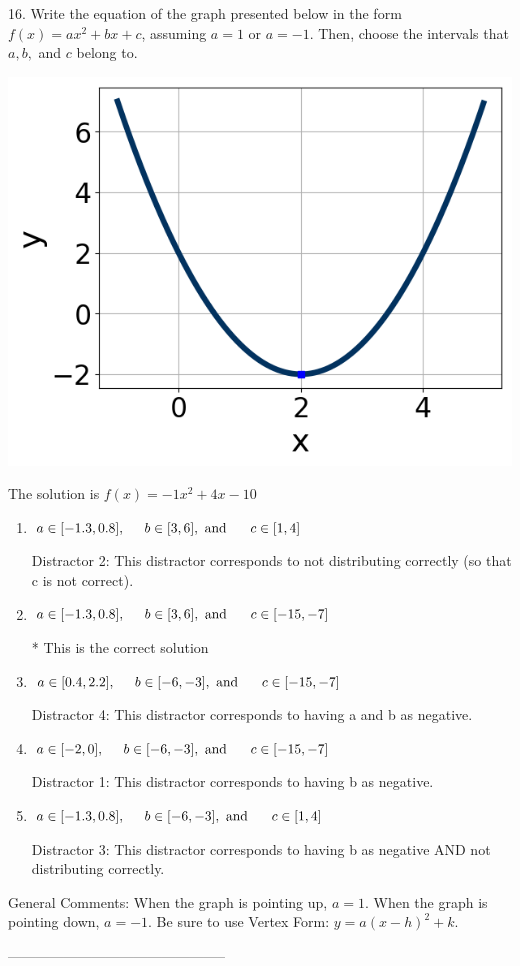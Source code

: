 16. Write the equation of the graph presented below in the form $f(x)=ax^2+bx+c$, assuming  $a=1$ or $a=-1$. Then, choose the intervals that $a, b,$ and $c$ belong to.
\begin{center} \includegraphics[scale=0.5]{../Figures/quadraticGraphToEquationA.png} \end{center}The solution is $ f(x) = -1x^{2} +4 x -10 $ 

\begin{enumerate}[label=\Alph*.] 
\item $ a \in [-1.3, 0.8], \hspace*{5mm} b \in [3, 6], \text{ and } \hspace*{5mm} c \in [1, 4] $ 

  Distractor 2: This distractor corresponds to not distributing correctly (so that c is not correct). 
\item $ a \in [-1.3, 0.8], \hspace*{5mm} b \in [3, 6], \text{ and } \hspace*{5mm} c \in [-15, -7] $ 

 * This is the correct solution 
\item $ a \in [0.4, 2.2], \hspace*{5mm} b \in [-6, -3], \text{ and } \hspace*{5mm} c \in [-15, -7] $ 

  Distractor 4: This distractor corresponds to having a and b as negative. 
\item $ a \in [-2, 0], \hspace*{5mm} b \in [-6, -3], \text{ and } \hspace*{5mm} c \in [-15, -7] $ 

  Distractor 1: This distractor corresponds to having b as negative. 
\item $ a \in [-1.3, 0.8], \hspace*{5mm} b \in [-6, -3], \text{ and } \hspace*{5mm} c \in [1, 4] $ 

  Distractor 3: This distractor corresponds to having b as negative AND not distributing correctly. 
\end{enumerate} 
 
General Comments: When the graph is pointing up, $a=1$. When the graph is pointing down, $a=-1$. Be sure to use Vertex Form: $y = a(x-h)^2+k$.

-----------------------------------------------

